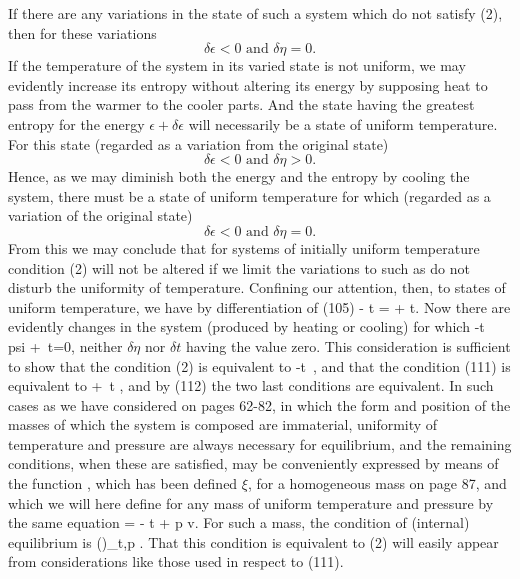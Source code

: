 \documentclass[12pt]{memoir}
\begin{document}
If there are any variations in the state of such a system which do
not satisfy (2), then for these variations
$$\delta \epsilon < 0 \text{  and  } \delta \eta = 0.$$
If the temperature of the system in its varied state is not uniform, we may evidently increase its entropy without altering its energy by supposing heat to pass from the warmer to the cooler parts. And the state having the greatest entropy for the energy $\epsilon + \delta \epsilon$ will necessarily  be a state of uniform temperature. For this state (regarded as a variation from the original state)
$$\delta \epsilon < 0 \text{  and  } \delta \eta > 0.$$
Hence, as we may diminish both the energy and the entropy by cooling the system, there must be a state of uniform temperature for which (regarded as a variation of the original state)
$$\delta \epsilon < 0 \text{  and  } \delta \eta = 0.$$
From this we may conclude that for systems of initially uniform temperature condition (2) will not be altered if we limit the variations to such as do not disturb the uniformity of temperature.
Confining our attention, then, to states of uniform temperature, we
have by differentiation of (105)
\eqs \delta \epsilon- t \delta \eta = \delta \psi + \eta \delta t.              \label{112}\eqe
Now there are evidently changes in the system (produced by heating or cooling) for which
\eqs \delta \epsilon -t \,\delta {} \delta psi + \eta \,\delta t=0,         \label{113}\eqe
neither $\delta \eta$ nor $\delta t$ having the value zero. This consideration is sufficient to show that the condition (2) is equivalent to
\eqs \delta \epsilon -t \,\delta \eta {},                      \label{114}\eqe
and that the condition (111) is equivalent to
\eqs \delta \psi + \eta \,\delta t ,                      \label{115}\eqe
and by (112) the two last conditions are equivalent.
In such cases as we have considered on pages 62-82, in which the form and position of the masses of which the system is composed are immaterial, uniformity of temperature and pressure are always necessary for equilibrium, and the remaining conditions, when these are satisfied, may be conveniently expressed by means of the function , which has been defined $\xi$, for a homogeneous mass on page 87, and which we will here define for any mass of uniform temperature and pressure by the same equation
\eqs \xi = \epsilon - t \eta + p v.  \label{116}\eqe
For such a mass, the condition of (internal) equilibrium is
\eqs (\delta \xi)_{t,p} .  \label{117}\eqe
That this condition is equivalent to (2) will easily appear from considerations like those used in respect to (111).
\end{document}

